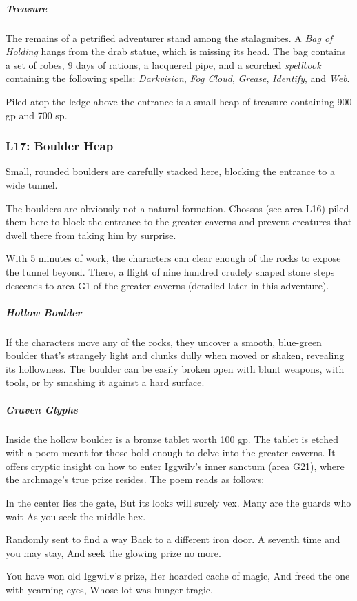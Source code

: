 \documentclass[10pt,a4paper,twoside,bg=print,twocolumn,openany,nodeprecatedcode]{dndbook}
\begin{document}
\subparagraph{Treasure}
The remains of a petrified adventurer stand among the stalagmites. A \textit{Bag of Holding} hangs from the drab statue, which is missing its head. The bag contains a set of robes, 9 days of rations, a lacquered pipe, and a scorched \textit{spellbook} containing the following spells: \textit{Darkvision}, \textit{Fog Cloud}, \textit{Grease}, \textit{Identify}, and \textit{Web}.

Piled atop the ledge above the entrance is a small heap of treasure containing 900 gp and 700 sp.

\subsubsection{L17: Boulder Heap}
\begin{DndReadAloud}{}
Small, rounded boulders are carefully stacked here, blocking the entrance to a wide tunnel.

\end{DndReadAloud}

The boulders are obviously not a natural formation. Chossos (see area L16) piled them here to block the entrance to the greater caverns and prevent creatures that dwell there from taking him by surprise.

With 5 minutes of work, the characters can clear enough of the rocks to expose the tunnel beyond. There, a flight of nine hundred crudely shaped stone steps descends to area G1 of the greater caverns (detailed later in this adventure).

\subparagraph{Hollow Boulder}
If the characters move any of the rocks, they uncover a smooth, blue-green boulder that's strangely light and clunks dully when moved or shaken, revealing its hollowness. The boulder can be easily broken open with blunt weapons, with tools, or by smashing it against a hard surface.

\subparagraph{Graven Glyphs}
Inside the hollow boulder is a bronze tablet worth 100 gp. The tablet is etched with a poem meant for those bold enough to delve into the greater caverns. It offers cryptic insight on how to enter Iggwilv's inner sanctum (area G21), where the archmage's true prize resides. The poem reads as follows:

\begin{DndReadAloud}{}
In the center lies the gate, But its locks will surely vex. Many are the guards who wait As you seek the middle hex.

Randomly sent to find a way Back to a different iron door. A seventh time and you may stay, And seek the glowing prize no more.

You have won old Iggwilv's prize, Her hoarded cache of magic, And freed the one with yearning eyes, Whose lot was hunger tragic.

\end{DndReadAloud}
\end{document}
